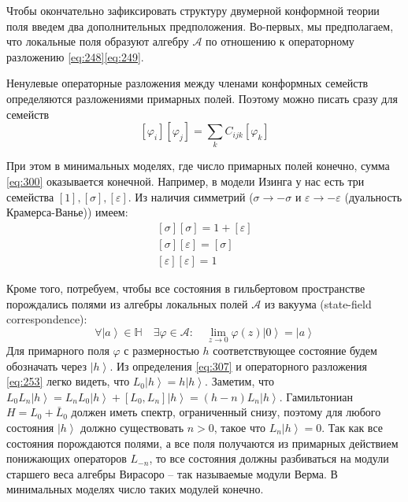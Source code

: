 \documentclass[a4paper,12pt]{article}
\theoremstyle{definition}
\theoremstyle{definition}
\theoremstyle{definition}
\begin{document}
Чтобы окончательно зафиксировать структуру двумерной конформной теории поля введем два дополнительных предположения. Во-первых, мы предполагаем, что локальные поля образуют алгебру $\mathcal{A}$ по отношению к операторному разложению \eqref{eq:248}\eqref{eq:249}.


Ненулевые операторные разложения между членами конформных семейств определяются разложениями примарных полей. Поэтому можно писать сразу для семейств
\begin{equation}
  \label{eq:300}
  [\varphi_i][\varphi_j]=\sum_k C_{ijk} [\varphi_k]
\end{equation}

При этом в минимальных моделях, где число примарных полей конечно, сумма \eqref{eq:300} оказывается конечной.
Например, в модели Изинга у нас есть три семейства $[1], [\sigma], [\varepsilon]$. Из наличия симметрий ($\sigma\to - \sigma$ и $\varepsilon\to -\varepsilon$ (дуальность Крамерса-Ванье)) имеем:
\begin{eqnarray}
  \label{eq:301}
  \left[\sigma\right]\left[\sigma\right]=1+\left[\varepsilon\right]\\
  \left[\sigma\right]\left[\varepsilon\right]=\left[\sigma\right]\\
  \left[\varepsilon\right]\left[\varepsilon\right]=1
\end{eqnarray}

Кроме того, потребуем, чтобы все состояния в гильбертовом пространстве порождались полями из алгебры локальных полей $\mathcal{A}$ из вакуума (state-field correspondence):
\begin{equation}
  \label{eq:307}
  \forall \left| a\right> \in \mathbb{H}\quad \exists \varphi\in\mathcal{A}:\quad \lim_{z\to 0}\varphi(z)\left|0\right>=\left|a\right>
\end{equation}
Для примарного поля $\varphi$ с размерностью $h$ соответствующее состояние будем обозначать через $\left|h\right>$. 
Из определения \eqref{eq:307} и операторного разложения \eqref{eq:253} легко видеть, что $L_{0}\left|h\right>=h\left|h\right>$.
Заметим, что $L_{0} L_{n}\left|h\right> = L_{n} L_{0}\left|h\right> + [L_{0},L_{n}]\left|h\right> = (h-n) L_{n}\left|h\right>$. 
Гамильтониан $H=L_{0}+\bar L_{0}$ должен иметь спектр, ограниченный снизу, поэтому для любого состояния $\left|h\right>$ должно существовать $n>0$, такое что $L_{n}\left|h\right> =0 $.
Так как все состояния порождаются полями, а все поля получаются из примарных действием понижающих операторов $L_{-n}$, то все состояния должны разбиваться на модули старшего веса алгебры Вирасоро -- так называемые модули Верма. В минимальных моделях число таких модулей конечно. 
\end{document}
